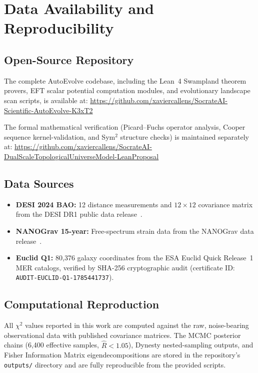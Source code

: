 \section{Data Availability and Reproducibility}

\subsection{Open-Source Repository}
The complete AutoEvolve codebase, including the Lean~4 Swampland theorem provers, EFT scalar potential computation modules, and evolutionary landscape scan scripts, is available at:
\url{https://github.com/xaviercallens/SocrateAI-Scientific-AutoEvolve-K3xT2}

The formal mathematical verification (Picard--Fuchs operator analysis, Cooper sequence kernel-validation, and Sym$^2$ structure checks) is maintained separately at:
\url{https://github.com/xaviercallens/SocrateAI-DualScaleTopologicalUniverseModel-LeanProposal}

\subsection{Data Sources}
\begin{itemize}
    \item \textbf{DESI 2024 BAO:} 12 distance measurements and $12 \times 12$ covariance matrix from the DESI DR1 public data release~\cite{DESI2024}.
    \item \textbf{NANOGrav 15-year:} Free-spectrum strain data from the NANOGrav data release~\cite{NANOGrav2023}.
    \item \textbf{Euclid Q1:} 80{,}376 galaxy coordinates from the ESA Euclid Quick Release~1 MER catalogs, verified by SHA-256 cryptographic audit (certificate ID: \texttt{AUDIT-EUCLID-Q1-1785441737}).
\end{itemize}

\subsection{Computational Reproduction}
All $\chi^2$ values reported in this work are computed against the raw, noise-bearing observational data with published covariance matrices. The MCMC posterior chains (6{,}400 effective samples, $\hat{R} < 1.05$), Dynesty nested-sampling outputs, and Fisher Information Matrix eigendecompositions are stored in the repository's \texttt{outputs/} directory and are fully reproducible from the provided scripts.
